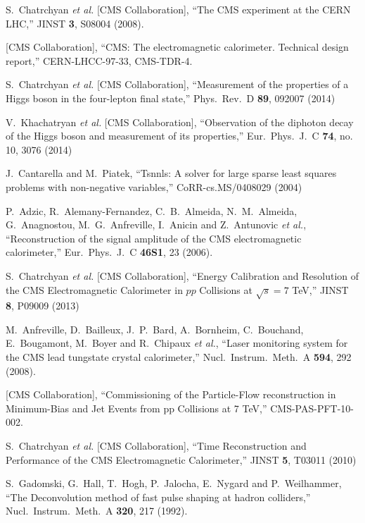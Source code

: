 \documentclass[journal]{IEEEtran}
\begin{document}
\begin{thebibliography}{1}

  S.~Chatrchyan {\it et al.}  [CMS Collaboration], ``The CMS experiment at the CERN LHC,'' JINST {\bf 3}, S08004 (2008).

  [CMS Collaboration], ``CMS: The electromagnetic calorimeter. Technical design report,''  CERN-LHCC-97-33, CMS-TDR-4.

  S.~Chatrchyan {\it et al.}  [CMS Collaboration], ``Measurement of the properties of a Higgs boson in the four-lepton final state,''
  Phys.\ Rev.\ D {\bf 89}, 092007 (2014)

  V.~Khachatryan {\it et al.}  [CMS Collaboration], ``Observation of the diphoton decay of the Higgs boson and measurement of its properties,''  Eur.\ Phys.\ J.\ C {\bf 74}, no. 10, 3076 (2014)

J.~Cantarella and M.~Piatek, ``Tsnnls: A solver for large sparse least squares problems with non-negative variables,'' CoRR-cs.MS/0408029 (2004)

  P.~Adzic, R.~Alemany-Fernandez, C.~B.~Almeida, N.~M.~Almeida, G.~Anagnostou, M.~G.~Anfreville, I.~Anicin and Z.~Antunovic {\it et al.}, ``Reconstruction of the signal amplitude of the CMS electromagnetic calorimeter,''  Eur.\ Phys.\ J.\ C {\bf 46S1}, 23 (2006).

  S.~Chatrchyan {\it et al.}  [CMS Collaboration], ``Energy Calibration and Resolution of the CMS Electromagnetic Calorimeter in $pp$ Collisions at $\sqrt{s} = 7$ TeV,''   JINST {\bf 8}, P09009 (2013)

  M.~Anfreville, D.~Bailleux, J.~P.~Bard, A.~Bornheim, C.~Bouchand, E.~Bougamont, M.~Boyer and R.~Chipaux {\it et al.}, ``Laser monitoring system for the CMS lead tungstate crystal calorimeter,''  Nucl.\ Instrum.\ Meth.\ A {\bf 594}, 292 (2008).

  [CMS Collaboration], ``Commissioning of the Particle-Flow reconstruction in Minimum-Bias and Jet Events from pp Collisions at 7 TeV,''  CMS-PAS-PFT-10-002.

  S.~Chatrchyan {\it et al.}  [CMS Collaboration], ``Time Reconstruction and Performance of the CMS Electromagnetic Calorimeter,''  JINST {\bf 5}, T03011 (2010)

  S.~Gadomski, G.~Hall, T.~Hogh, P.~Jalocha, E.~Nygard and P.~Weilhammer, ``The Deconvolution method of fast pulse shaping at hadron colliders,''  Nucl.\ Instrum.\ Meth.\ A {\bf 320}, 217 (1992).

\end{thebibliography}


\end{document}

